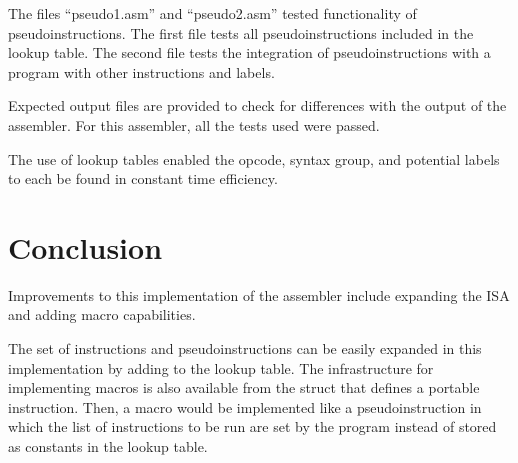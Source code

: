 \documentclass[titlepage]{article}
\begin{document}
The files ``pseudo1.asm'' and ``pseudo2.asm'' tested functionality of 
pseudoinstructions. The first file tests all pseudoinstructions included in the
lookup table. The second file tests the integration of pseudoinstructions with
a program with other instructions and labels. 

Expected output files are provided to check for differences with the output of
the assembler. For this assembler, all the tests used were passed.

The use of lookup tables enabled the opcode, syntax group, and potential labels 
to each be found in constant time efficiency. 

\section*{Conclusion}
Improvements to this implementation of the assembler include expanding the ISA
and adding macro capabilities.

The set of instructions and pseudoinstructions can be easily expanded in this
implementation by adding to the lookup table. The infrastructure for 
implementing macros is also available from the struct that defines a portable
instruction. Then, a macro would be implemented like a pseudoinstruction in 
which the list of instructions to be run are set by the program instead of 
stored as constants in the lookup table.
\end{document}
